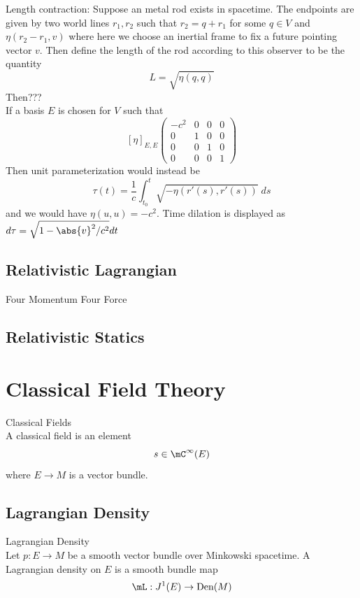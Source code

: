 \documentclass[a4paper]{article}
\begin{document}
Length contraction: Suppose an metal rod exists in spacetime. The endpoints are given by two world lines $r_1,r_2$ such that $r_2=q+r_1$ for some $q\in V$ and $\eta(r_2-r_1,v)$ where here we choose an inertial frame to fix a future pointing vector $v$. Then define the length of the rod according to this observer to be the quantity $$L=\sqrt{\eta(q,q)}$$ Then???\\

If a basis $E$ is chosen for $V$ such that $$[\eta]_{E,E}\begin{pmatrix}
-c^2 & 0 & 0 & 0\\
0 & 1 & 0 & 0\\
0 & 0 & 1 & 0\\
0 & 0 & 0 & 1
\end{pmatrix}$$ Then unit parameterization would instead be $$\tau(t)=\frac{1}{c}\int_{t_0}^t\sqrt{-\eta(r'(s),r'(s))}\;ds$$ and we would have $\eta(u,u)=-c^2$. Time dilation is displayed as $d\tau=\sqrt{1-\abs{v}^2/c^2}dt$

\subsection{Relativistic Lagrangian}
Four Momentum
Four Force

\subsection{Relativistic Statics}

\pagebreak
\section{Classical Field Theory}

\begin{defn}{Classical Fields}{}\\
A classical field is an element $$s\in\mC^\infty(E)$$ where $E\to M$ is a vector bundle. 
\end{defn}

\subsection{Lagrangian Density}
\begin{defn}{Lagrangian Density}{}\\
Let $p:E\to M$ be a smooth vector bundle over Minkowski spacetime. A Lagrangian density on $E$ is a smooth bundle map $$\mL:J^1(E)\to\text{Den}(M)$$
\end{defn}
\end{document}
